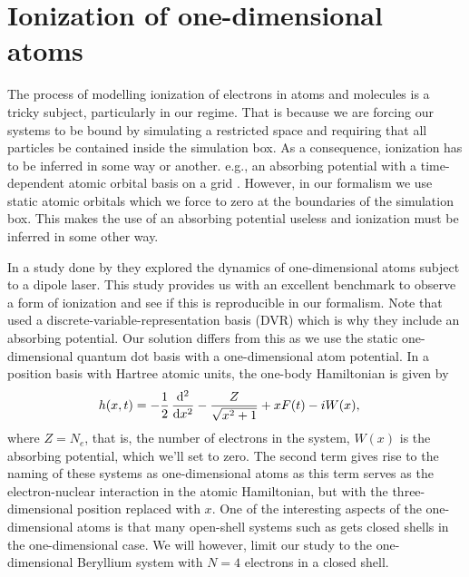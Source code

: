     \section{Ionization of one-dimensional atoms}
        The process of modelling ionization of electrons in atoms and
        molecules is a tricky subject, particularly in our regime.
        That is because we are forcing our systems to be bound by simulating a
        restricted space and requiring that all particles be contained inside
        the simulation box.
        As a consequence, ionization has to be inferred in some way or another.
        e.g., an absorbing potential with a time-dependent atomic orbital basis
        on a grid \cite{kosloff1986363, miyagi_and_madsen, takeshi}.
        However, in our formalism we use static atomic orbitals which we
        force to zero at the boundaries of the simulation box.
        This makes the use of an absorbing potential useless and ionization
        must be inferred in some other way.

        In a study done by \citeauthor{miyagi_and_madsen}
        \cite{miyagi_and_madsen} they explored the dynamics of one-dimensional
        atoms subject to a dipole laser.
        This study provides us with an excellent benchmark to observe a form
        of ionization and see if this is reproducible in our formalism.
        Note that \citeauthor{miyagi_and_madsen} used a
        discrete-variable-representation basis (DVR) which is why they include
        an absorbing potential.
        Our solution differs from this as we use the static one-dimensional
        quantum dot basis with a one-dimensional atom potential.
        In a position basis with Hartree atomic units, the one-body
        Hamiltonian is given by \cite{miyagi_and_madsen}
        \begin{align}
            \oneten(x, t)
            &= -\half \dod[2]{}{x}
            - \frac{Z}{\sqrt{x^2 + 1}}
            + xF(t)
            - iW(x),
        \end{align}
        where $Z = N_e$, that is, the number of electrons in the system,
        $W(x)$ is the absorbing potential, which we'll set to zero.
        The second term gives rise to the naming of these systems as
        one-dimensional atoms as this term serves as the electron-nuclear
        interaction in the atomic Hamiltonian, but with the three-dimensional
        position replaced with $x$.
        One of the interesting aspects of the one-dimensional atoms is that many
        open-shell systems such as  gets closed shells in the
        one-dimensional case.
        We will however, limit our study to the one-dimensional Beryllium
        system with $N = 4$ electrons in a closed shell.

